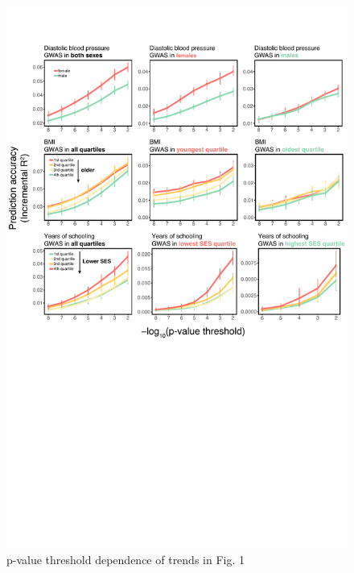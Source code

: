 \documentclass[hidelinks, 12pt]{article}
\begin{document}
\begin{figure}[h!]
\includegraphics[width=\textwidth]{./supp_figures/fig1_Rsweep.pdf}
\caption{p-value threshold dependence of trends in Fig. 1}
\centering
\end{figure}
\end{document}
